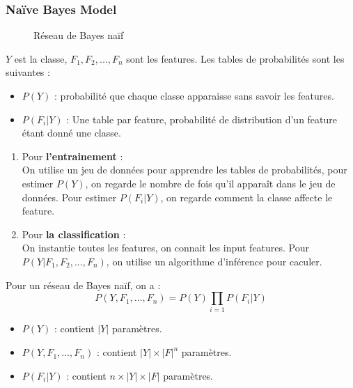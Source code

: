 \subsubsection{Naïve Bayes Model}
\begin{figure}[H]
    \centering
    \caption{Réseau de Bayes naïf}
\end{figure}
$Y$ est la classe, $F_1, F_2, ..., F_n$ sont les features. Les tables de probabilités sont les suivantes :
\begin{itemize}[label=\textbullet]
    \item $P(Y)$ : probabilité que chaque classe apparaisse sans savoir les features.
    \item $P(F_i|Y)$ : Une table par feature, probabilité de distribution d'un feature étant donné une classe.
\end{itemize}
\begin{enumerate}
    \item Pour \textbf{l'entrainement} :\\
    On utilise un jeu de données pour apprendre les tables de probabilités, pour estimer $P(Y)$, on regarde le nombre de fois
    qu'il apparaît dans le jeu de données. Pour estimer $P(F_i|Y)$, on regarde comment la classe affecte le feature.
    \item Pour \textbf{la classification} :\\
    On instantie toutes les features, on connait les input features. Pour $P(Y|F_1, F_2, ..., F_n)$, on utilise un algorithme
    d'inférence pour caculer.
\end{enumerate}
Pour un réseau de Bayes naïf, on a :
\begin{equation*}
    P(Y,F_1,\dots,F_n) = P(Y) \prod_{i=1} P(F_i|Y)
\end{equation*}
\begin{itemize}
    \item $P(Y)$ : contient $|Y|$ paramètres.
    \item $P(Y,F_1,\dots,F_n)$ : contient $|Y| \times |F|^n$ paramètres.
    \item $P(F_i|Y)$ : contient $n\times |Y| \times |F|$ paramètres.
\end{itemize}

